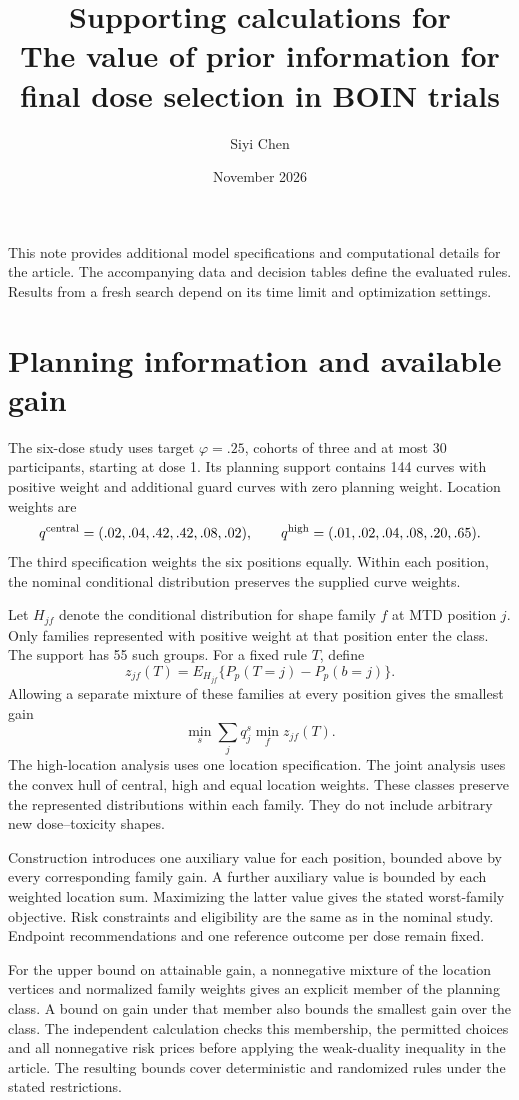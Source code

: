 \documentclass[letterpaper,12pt]{article}
\title{Supporting calculations for\\The value of prior information for final dose selection in BOIN trials}
\author{Siyi Chen}
\date{November 2026}
\begin{document}
\maketitle
\linenumbers
This note provides additional model specifications and computational
details for the article. The accompanying data and decision tables
define the evaluated rules. Results from a fresh search depend on its
time limit and optimization settings.

\section{Planning information and available gain}

The six-dose study uses target $\varphi=.25$, cohorts of three and at
most 30 participants, starting at dose 1. Its planning support contains
144 curves with positive weight and additional guard curves with zero
planning weight. Location weights are
\[
 q^{\rm central}=(.02,.04,.42,.42,.08,.02),\qquad
 q^{\rm high}=(.01,.02,.04,.08,.20,.65).
\]
The third specification weights the six positions equally.
Within each position, the nominal conditional distribution preserves
the supplied curve weights.

Let $H_{jf}$ denote the conditional distribution for shape family $f$
at MTD position $j$. Only families represented with positive weight at
that position enter the class. The support has 55 such groups.
For a fixed rule $T$, define
\[
 z_{jf}(T)=E_{H_{jf}}\{P_p(T=j)-P_p(b=j)\}.
\]
Allowing a separate mixture of these families at every position gives
the smallest gain
\[
 \min_s\sum_j q_j^s\min_f z_{jf}(T).
\]
The high-location analysis uses one location specification. The joint
analysis uses the convex hull of central, high and equal location
weights. These classes preserve the represented distributions within
each family. They do not include arbitrary new dose--toxicity shapes.

Construction introduces one auxiliary value for each position,
bounded above by every corresponding family gain. A further auxiliary
value is bounded by each weighted location sum. Maximizing the latter
value gives the stated worst-family objective. Risk constraints and
eligibility are the same as in the nominal study. Endpoint
recommendations and one reference outcome per dose remain fixed.

For the upper bound on attainable gain, a nonnegative mixture of the
location vertices and normalized family weights gives an explicit
member of the planning class. A bound on gain under that member also
bounds the smallest gain over the class. The independent calculation
checks this membership, the permitted choices and all nonnegative risk
prices before applying the weak-duality inequality in the article.
The resulting bounds cover deterministic and randomized rules under
the stated restrictions.
\end{document}
